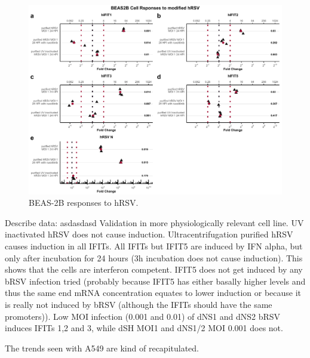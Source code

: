 \begin{figure}
    \centering
    \includegraphics[width=1\linewidth]{06. Chapter 1/Figs/01. Induction/10. beas2b_hrsv.pdf}
    \caption[BEAS-2B responses to hRSV.]{BEAS-2B responses to hRSV.}
    \label{BEAS-2B responses to hRSV.}
\end{figure}



Describe data: \newline
asdasdasd \newline
Validation in more physiologically relevant cell line. UV inactivated hRSV does not cause induction. Ultracentrifugation purified hRSV causes induction in all IFITs. All IFITs but IFIT5 are induced by IFN alpha, but only after incubation for 24 hours (3h incubation does not cause induction). This shows that the cells are interferon competent. IFIT5 does not get induced by any bRSV infection tried (probably because IFIT5 has either basally higher levels and thus the same end mRNA concentration equates to lower induction or because it is really not induced by bRSV (although the IFITs should have the same promoters)). Low MOI infection (0.001 and 0.01) of dNS1 and dNS2 bRSV induces IFITs 1,2 and 3, while dSH MOI1 and dNS1/2 MOI 0.001 does not. 

The trends seen with A549 are kind of recapitulated.


